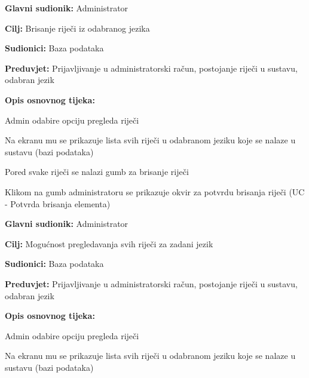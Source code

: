 \noindent {}
\begin{packed_item}

	\item \textbf{Glavni sudionik: } Administrator
	\item \textbf{Cilj: } Brisanje riječi iz odabranog jezika
	\item \textbf{Sudionici: } Baza podataka
	\item \textbf{Preduvjet: } Prijavljivanje u administratorski račun, postojanje riječi u sustavu, odabran jezik
	\item  \textbf{Opis osnovnog tijeka:}
	
	\item[] \begin{packed_enum}
		
		\item Admin odabire opciju pregleda riječi
		\item Na ekranu mu se prikazuje lista svih riječi u odabranom jeziku koje se nalaze u sustavu (bazi podataka)
		\item Pored svake riječi se nalazi gumb za brisanje riječi
		\item Klikom na gumb administratoru se prikazuje okvir za potvrdu brisanja riječi (UC - Potvrda brisanja elementa)

	\end{packed_enum}
	
\end{packed_item}


\noindent {}
\begin{packed_item}

	\item \textbf{Glavni sudionik: } Administrator
	\item \textbf{Cilj: } Mogućnost pregledavanja svih riječi za zadani jezik
	\item \textbf{Sudionici: } Baza podataka
	\item \textbf{Preduvjet: } Prijavljivanje u administratorski račun, postojanje riječi u sustavu, odabran jezik
	\item  \textbf{Opis osnovnog tijeka:}
	
	\item[] \begin{packed_enum}
		
		\item Admin odabire opciju pregleda riječi
		\item Na ekranu mu se prikazuje lista svih riječi u odabranom jeziku koje se nalaze u sustavu (bazi podataka)

	\end{packed_enum}
	
\end{packed_item}

